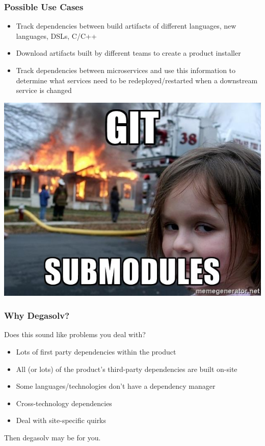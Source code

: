 \documentclass{beamer}
\begin{document}
\begin{frame}
    \frametitle{Possible Use Cases}
    \begin{itemize}
        \item Track dependencies between build artifacts of different
            languages, new languages, DSLs, C/C++
        \item Download artifacts built by different teams to create a
            product installer
        \item Track dependencies between microservices and use this information
            to determine what services need to be redeployed/restarted
            when a downstream service is changed
    \end{itemize}
\end{frame}
\begin{frame}
  \centerline{\includegraphics[scale=0.5]{gitsubmodules.jpg}}
\end{frame}
\begin{frame}
  \frametitle{Why Degasolv?}

  Does this sound like problems you deal with?

  \break

  \begin{itemize}
  \item Lots of first party dependencies within the product
  \item All (or lots) of the product's third-party dependencies are built
      on-site
  \item Some languages/technologies don't have a dependency manager
  \item Cross-technology dependencies
  \item Deal with site-specific quirks
  \end{itemize}

  \break

  Then degasolv may be for you.

\end{frame}
\end{document}
